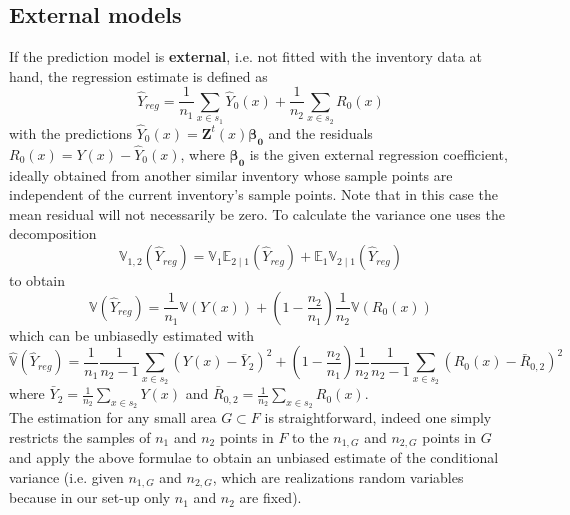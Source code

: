 \documentclass[a4paper,12pt,leqno, titlepage]{article}
\newcommand{\EX}{\mathbb{E}}
\newcommand{\VAR}{\mathbb{V}}
\begin{document}
\subsection{External models}
If the prediction model is \textbf{external}, i.e. not fitted with the inventory data at hand, the regression estimate is defined as
\begin{equation}\label{external1}
\hat{Y}_{reg}=\frac{1}{n_1}\sum_{x\in{s_1}}\hat{Y}_0(x)+ \frac{1}{n_2}\sum_{x\in{s_2}}R_0(x)
\end{equation}
with the predictions $\hat{Y}_0(x)=\pmb{Z}^t(x)\pmb{\beta_0}$ and the residuals $R_0(x)=Y(x)-\hat{Y}_0(x)$, where $\pmb{\beta_0}$ is the given external regression coefficient, ideally obtained from another similar inventory whose sample points are independent of the current inventory's sample points. Note that in this case the mean residual will not necessarily be zero.
To calculate the variance one uses the decomposition
\begin{equation}\label{external2}
\VAR_{1,2}(\hat{Y}_{reg})=\VAR_1\EX_{2\mid 1}(\hat{Y}_{reg})+\EX_1\VAR_{2 \mid 1}(\hat{Y}_{reg})
\end{equation} to obtain
\begin{equation}\label{external3}
\VAR(\hat{Y}_{reg})=\frac{1}{n_1}\VAR(Y(x))+(1-\frac{n_2}{n_1})\frac{1}{n_2}\VAR(R_0(x))
 \end{equation}
 which can be unbiasedly estimated with
\begin{equation}\label{varexternalsimple}
\hat{\VAR}(\hat{Y}_{reg})=\frac{1}{n_1}\frac{1}{n_2-1}\sum_{x\in{s_2}}(Y(x)-\bar{Y}_2)^2+
(1-\frac{n_2}{n_1})\frac{1}{n_2}\frac{1}{n_2-1}\sum_{x\in{s_2}}(R_0(x)-\bar{R}_{0,2})^2
\end{equation}
where $\bar{Y}_2=\frac{1}{n_2}\sum_{x\in{s_2}}Y(x)$ and $\bar{R}_{0,2}=\frac{1}{n_2}\sum_{x\in{s_2}}R_0(x)$.\\
The estimation for any small area $G\subset F$ is straightforward, indeed one simply restricts the samples of $n_1$ and $n_2$ points in $F$ to the $n_{1,G}$ and $n_{2,G}$ points in $G$ and apply the above formulae to obtain an unbiased estimate of the conditional variance (i.e. given $n_{1,G}$ and $n_{2,G}$, which are realizations random variables because in our set-up only $n_1$ and $n_2$ are fixed).
\end{document}
